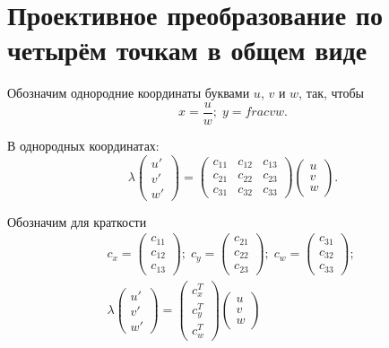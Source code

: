 \section{Проективное преобразование по четырём точкам в общем виде}

Обозначим однородние координаты  буквами $u$, $v$ и $w$, так, чтобы
$$x = \frac{u}{w};\; y = frac{v}{w}.$$


В однородных координатах:
$$
\lambda
\begin{pmatrix}	u' \\ v' \\ w' \end{pmatrix}
= 
\begin{pmatrix}
	c_{11} & c_{12} & c_{13} \\
	c_{21} & c_{22} & c_{23} \\
	c_{31} & c_{32} & c_{33}
\end{pmatrix}
\begin{pmatrix}	u \\ v \\ w \end{pmatrix}
.
$$


Обозначим для краткости 
\begin{eqnarray*}
	c_x = \begin{pmatrix}	c_{11} \\  c_{12} \\ c_{13} \end{pmatrix};\; 
	c_y = \begin{pmatrix}	c_{21} \\  c_{22} \\ c_{23} \end{pmatrix};\; 
	c_w = \begin{pmatrix}	c_{31} \\  c_{32} \\ c_{33} \end{pmatrix};\; 
\\
\lambda
\begin{pmatrix}	u' \\ v' \\ w' \end{pmatrix}
= 
\begin{pmatrix}
	c_x^T\\
	c_y^T\\
	c_w^T
\end{pmatrix}
\begin{pmatrix}	u \\ v \\ w \end{pmatrix}
\end{eqnarray*}

